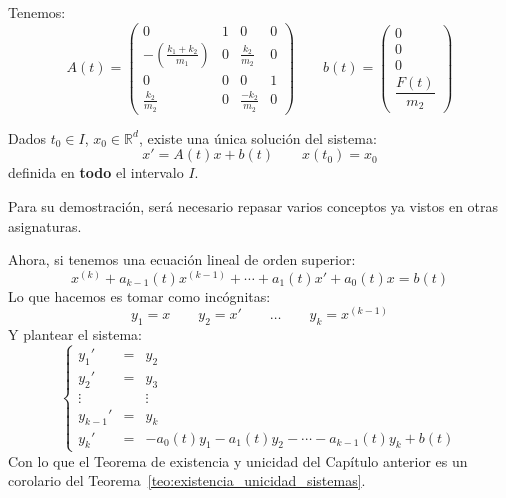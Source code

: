 \begin{ejemplo}
    Tenemos:
    \begin{equation*}
        A(t) = \left(\begin{array}{cccc}
                0 & 1 & 0 & 0 \\
                -\left(\frac{k_1+k_2}{m_1}\right) & 0 & \frac{k_2}{m_2} & 0 \\
                0 & 0 & 0 & 1 \\
                \frac{k_2}{m_2} & 0 & \frac{-k_2}{m_2} & 0
        \end{array}\right) \qquad b(t) = \left(\begin{array}{c}
            0 \\
            0 \\
            0 \\
            \dfrac{F(t)}{m_2}
        \end{array}\right)
    \end{equation*}
\end{ejemplo}

\begin{teo}\label{teo:existencia_unicidad_sistemas}
    Dados $t_0\in I$, $x_0\in \mathbb{R}^d$, existe una única solución del sistema:
    \begin{equation*}
        x' = A(t)x + b(t) \qquad x(t_0) = x_0
    \end{equation*}
    definida en \textbf{todo} el intervalo $I$.
\end{teo}
Para su demostración, será necesario repasar varios conceptos ya vistos en otras asignaturas.

\begin{coro}
Ahora, si tenemos una ecuación lineal de orden superior:
\begin{equation*}
    x^{(k)} + a_{k-1}(t) x^{(k-1)} + \cdots + a_1(t)x' + a_0(t)x = b(t)
\end{equation*}
Lo que hacemos es tomar como incógnitas:
\begin{equation*}
    y_1 = x \qquad y_2 = x' \qquad \ldots \qquad y_k = x^{(k-1)}
\end{equation*}
Y plantear el sistema:
\begin{equation*}
    \left\{\begin{array}{rcl}
            y_1' &=& y_2 \\
            y_2' &=& y_3 \\
            \vdots && \vdots \\
            y_{k-1}' &=& y_k \\
            y_k' &=& -a_0(t)y_1 -a_1(t) y_2 - \cdots - a_{k-1}(t)y_k + b(t)
    \end{array}\right.
\end{equation*}
Con lo que el Teorema de existencia y unicidad del Capítulo anterior es un corolario del Teorema~\ref{teo:existencia_unicidad_sistemas}.
\end{coro}

